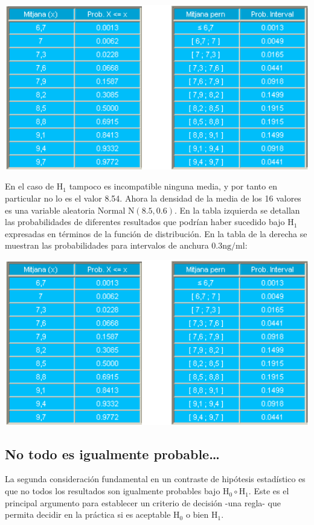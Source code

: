 \documentclass[
]{article}
\begin{document}
\begin{center}\includegraphics[width=0.9\linewidth]{images/cap9-comparaProbs} \end{center}

En el caso de \(\mathrm{H}_{1}\) tampoco es incompatible ninguna media, y por tanto en particular no lo es el valor 8.54. Ahora la densidad de la media de los 16 valores es una variable aleatoria Normal \(\mathrm{N}(8.5,0.6)\). En la tabla izquierda se detallan las probabilidades de diferentes resultados que podrían haber sucedido bajo \(\mathrm{H}_{1}\) expresadas en términos de la función de distribución. En la tabla de la derecha se muestran las probabilidades para intervalos de anchura \(0.3 \mathrm{ng} / \mathrm{ml}\):

\begin{center}\includegraphics[width=0.9\linewidth]{images/cap9-comparaProbs} \end{center}

\subsection{No todo es igualmente probable\ldots{}}\label{no-todo-es-igualmente-probable}

La segunda consideración fundamental en un contraste de hipótesis estadístico es que no todos los resultados son igualmente probables bajo \(\mathrm{H}_{0} \circ \mathrm{H}_{1}\). Este es el principal argumento para establecer un criterio de decisión -una regla- que permita decidir en la práctica si es aceptable \(\mathrm{H}_{0}\) o bien \(\mathrm{H}_{1}\).
\end{document}
